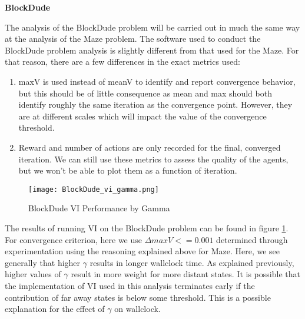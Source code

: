 \documentclass{article}
\begin{document}
\textbf{BlockDude}

The analysis of the BlockDude problem will be carried out in much the same way at the analysis of the Maze problem.
The software used to conduct the BlockDude problem analysis is slightly different from that used for the Maze. For
that reason, there are a few differences in the exact metrics used:

\begin{enumerate}
    \item maxV is used instead of meanV to identify and report convergence behavior, but this should be of little
    consequence as mean and max should both identify roughly the same iteration as the convergence point. However,
    they are at different scales which will impact the value of the convergence threshold.
    \item Reward and number of actions are only recorded for the final, converged iteration. We can still use
    these metrics to assess the quality of the agents, but we won't be able to plot them as a function of iteration.
\end{enumerate}

\begin{figure}
    \centering
    \texttt{[image: BlockDude\_vi\_gamma.png]}
    \caption{BlockDude VI Performance by Gamma}
    \label{fig:bd-vi}
\end{figure}

The results of running VI on the BlockDude problem can be found in figure \ref{fig:bd-vi}. For convergence criterion,
here we use $\Delta maxV <= 0.001$ determined through experimentation using the reasoning explained above for Maze. Here, we
see generally that higher $\gamma$ results in longer wallclock time. As explained previously, higher values of $\gamma$
result in more weight for more distant states. It is possible that the implementation of VI used in this analysis terminates
early if the contribution of far away states is below some threshold. This is a possible explanation for the effect of
$\gamma$ on wallclock.
\end{document}
